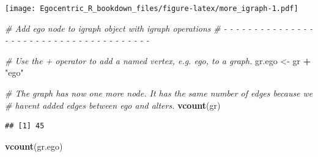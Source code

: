 \documentclass[
]{book}
\newenvironment{Shaded}{\begin{snugshade}}{\end{snugshade}}
\newcommand{\AttributeTok}[1]{\textcolor[rgb]{0.13,0.29,0.53}{#1}}
\newcommand{\CommentTok}[1]{\textcolor[rgb]{0.56,0.35,0.01}{\textit{#1}}}
\newcommand{\ConstantTok}[1]{\textcolor[rgb]{0.56,0.35,0.01}{#1}}
\newcommand{\DecValTok}[1]{\textcolor[rgb]{0.00,0.00,0.81}{#1}}
\newcommand{\FunctionTok}[1]{\textcolor[rgb]{0.13,0.29,0.53}{\textbf{#1}}}
\newcommand{\NormalTok}[1]{#1}
\newcommand{\OtherTok}[1]{\textcolor[rgb]{0.56,0.35,0.01}{#1}}
\newcommand{\SpecialCharTok}[1]{\textcolor[rgb]{0.81,0.36,0.00}{\textbf{#1}}}
\newcommand{\StringTok}[1]{\textcolor[rgb]{0.31,0.60,0.02}{#1}}
\begin{document}
\begin{Shaded}
\end{Shaded}

\texttt{[image: Egocentric\_R\_bookdown\_files/figure-latex/more\_igraph-1.pdf]}

\begin{Shaded}
\begin{Highlighting}[]
\CommentTok{\# Add ego node to igraph object with igraph operations}
\CommentTok{\# {-} {-} {-} {-} {-} {-} {-} {-} {-} {-} {-} {-} {-} {-} {-} {-} {-} {-} {-} {-} {-} {-} {-} {-} {-} {-} {-} {-} {-} {-} {-} {-} {-} {-} {-} {-} {-} {-} {-} }

\CommentTok{\# Use the + operator to add a named vertex, e.g. ego, to a graph.}
\NormalTok{gr.ego }\OtherTok{\textless{}{-}}\NormalTok{ gr }\SpecialCharTok{+} \StringTok{"ego"}

\CommentTok{\# The graph has now one more node. It has the same number of edges because we}
\CommentTok{\# haven\textquotesingle{}t added edges between ego and alters.}
\FunctionTok{vcount}\NormalTok{(gr)}
\end{Highlighting}
\end{Shaded}

\begin{verbatim}
## [1] 45
\end{verbatim}

\begin{Shaded}
\begin{Highlighting}[]
\FunctionTok{vcount}\NormalTok{(gr.ego)}
\end{Highlighting}
\end{Shaded}
\end{document}
